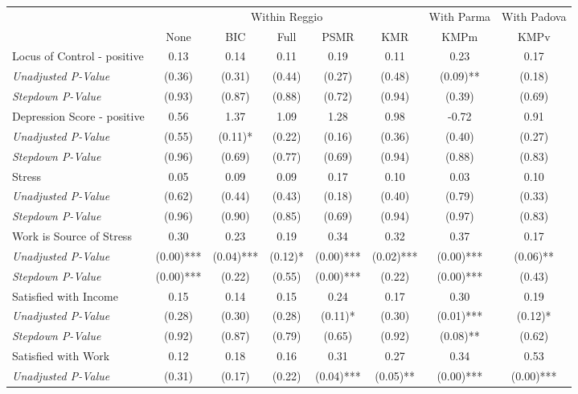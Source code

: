 \begin{tabular}{l c c c c c c c}
\toprule
& \multicolumn{5}{c}{Within Reggio} & With Parma & With Padova \\\cmidrule(lr){2-6} \cmidrule(lr){7-7} \cmidrule(lr){8-8}
 & None & BIC & Full & PSMR & KMR & KMPm & KMPv \\
\midrule
Locus of Control - positive & 0.13 & 0.14 & 0.11 & 0.19 & 0.11 & 0.23 & 0.17 \\
\quad \textit{Unadjusted P-Value} & (0.36) & (0.31) & (0.44) & (0.27) & (0.48) & (0.09)** & (0.18) \\
\quad \textit{Stepdown P-Value} & (0.93) & (0.87) & (0.88) & (0.72) & (0.94) & (0.39) & (0.69) \\
Depression Score - positive & 0.56 & 1.37 & 1.09 & 1.28 & 0.98 & -0.72 & 0.91 \\
\quad \textit{Unadjusted P-Value} & (0.55) & (0.11)* & (0.22) & (0.16) & (0.36) & (0.40) & (0.27) \\
\quad \textit{Stepdown P-Value} & (0.96) & (0.69) & (0.77) & (0.69) & (0.94) & (0.88) & (0.83) \\
Stress & 0.05 & 0.09 & 0.09 & 0.17 & 0.10 & 0.03 & 0.10 \\
\quad \textit{Unadjusted P-Value} & (0.62) & (0.44) & (0.43) & (0.18) & (0.40) & (0.79) & (0.33) \\
\quad \textit{Stepdown P-Value} & (0.96) & (0.90) & (0.85) & (0.69) & (0.94) & (0.97) & (0.83) \\
Work is Source of Stress & 0.30 & 0.23 & 0.19 & 0.34 & 0.32 & 0.37 & 0.17 \\
\quad \textit{Unadjusted P-Value} & (0.00)*** & (0.04)*** & (0.12)* & (0.00)*** & (0.02)*** & (0.00)*** & (0.06)** \\
\quad \textit{Stepdown P-Value} & (0.00)*** & (0.22) & (0.55) & (0.00)*** & (0.22) & (0.00)*** & (0.43) \\
Satisfied with Income & 0.15 & 0.14 & 0.15 & 0.24 & 0.17 & 0.30 & 0.19 \\
\quad \textit{Unadjusted P-Value} & (0.28) & (0.30) & (0.28) & (0.11)* & (0.30) & (0.01)*** & (0.12)* \\
\quad \textit{Stepdown P-Value} & (0.92) & (0.87) & (0.79) & (0.65) & (0.92) & (0.08)** & (0.62) \\
Satisfied with Work & 0.12 & 0.18 & 0.16 & 0.31 & 0.27 & 0.34 & 0.53 \\
\quad \textit{Unadjusted P-Value} & (0.31) & (0.17) & (0.22) & (0.04)*** & (0.05)** & (0.00)*** & (0.00)*** \\

\end{tabular}
